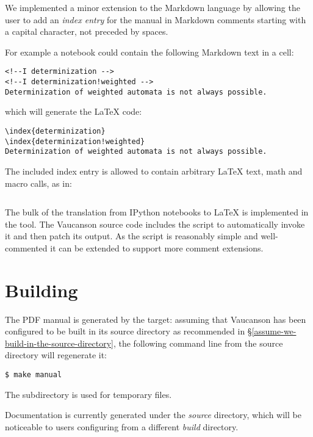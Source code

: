 We implemented a minor extension to the Markdown language by allowing
the user to add an \textit{index entry} for the manual in Markdown
comments starting with a capital  character, not preceded by
spaces.

For example a notebook could contain the following Markdown text in a cell:
\begin{verbatim}
<!--I determinization -->
<!--I determinization!weighted -->
Determinization of weighted automata is not always possible.
\end{verbatim}
which will generate the \LaTeX{} code:
\begin{verbatim}
\index{determinization}
\index{determinization!weighted}
Determinization of weighted automata is not always possible.
\end{verbatim}

The included index entry is allowed to contain arbitrary \LaTeX{}
text, math and macro calls, as in:
\begin{verbatim}

\end{verbatim}

The bulk of the translation from IPython notebooks to \LaTeX{} is implemented
in the  tool.  The Vaucanson source code
includes the script  to automatically
invoke it and then patch its output.  As the script is reasonably simple
and well-commented it can be extended to support more comment
extensions.

\section{Building}
The PDF manual is generated by the  target: assuming that
Vaucanson has been configured to be built in its source directory as
recommended in §\ref{assume-we-build-in-the-source-directory}, the
following command line from the source directory will regenerate it:\
\begin{verbatim}
$ make manual
\end{verbatim}
The subdirectory  is used for temporary
files.

Documentation is currently generated under the \textit{source}
directory, which will be noticeable to users configuring from a
different \textit{build} directory.
